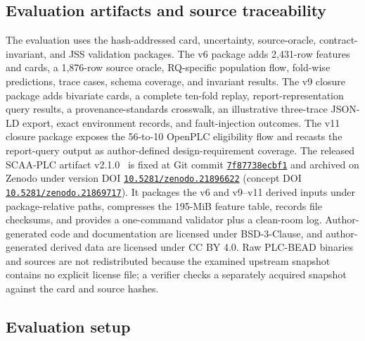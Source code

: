 \documentclass[a4paper,fleqn]{cas-dc}
\begin{document}
\subsection{Evaluation artifacts and source traceability}

The evaluation uses the hash-addressed card, uncertainty, source-oracle, contract-invariant, and JSS validation packages. The v6 package adds 2{,}431-row features and cards, a 1{,}876-row source oracle, RQ-specific population flow, fold-wise predictions, trace cases, schema coverage, and invariant results. The v9 closure package adds bivariate cards, a complete ten-fold replay, report-representation query results, a provenance-standards crosswalk, an illustrative three-trace JSON-LD export, exact environment records, and fault-injection outcomes. The v11 closure package exposes the 56-to-10 OpenPLC eligibility flow and recasts the report-query output as author-defined design-requirement coverage. The released SCAA-PLC artifact v2.1.0~\citep{scaa_plc_artifact_v2} is fixed at Git commit \href{https://github.com/Mewtwoz/SCAA_PLC_ARTIFACT/commit/7f87738ecbf19c09d5d63bee99e6de86ac32bce1}{\texttt{7f87738ecbf1}} and archived on Zenodo under version DOI \href{https://doi.org/10.5281/zenodo.21896622}{\texttt{10.5281/zenodo.21896622}} (concept DOI \href{https://doi.org/10.5281/zenodo.21869717}{\texttt{10.5281/zenodo.21869717}}). It packages the v6 and v9--v11 derived inputs under package-relative paths, compresses the 195-MiB feature table, records file checksums, and provides a one-command validator plus a clean-room log. Author-generated code and documentation are licensed under BSD-3-Clause, and author-generated derived data are licensed under CC BY 4.0. Raw PLC-BEAD binaries and sources are not redistributed because the examined upstream snapshot contains no explicit license file; a verifier checks a separately acquired snapshot against the card and source hashes.

\subsection{Evaluation setup}
\end{document}
